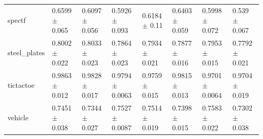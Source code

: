 \begin{tabular}{llllllll}
spectf & 0.6599 $\pm$ 0.065 & 0.6097 $\pm$ 0.056 & 0.5926 $\pm$ 0.093 & 0.6184 $\pm$ 0.11 & 0.6403 $\pm$ 0.059 & 0.5998 $\pm$ 0.072 & 0.539 $\pm$ 0.067 \\
steel\_plates & 0.8002 $\pm$ 0.022 & 0.8033 $\pm$ 0.023 & 0.7864 $\pm$ 0.023 & 0.7934 $\pm$ 0.021 & 0.7877 $\pm$ 0.016 & 0.7953 $\pm$ 0.015 & 0.7792 $\pm$ 0.021 \\
tictactoe & 0.9863 $\pm$ 0.012 & 0.9828 $\pm$ 0.017 & 0.9794 $\pm$ 0.0063 & 0.9759 $\pm$ 0.015 & 0.9815 $\pm$ 0.013 & 0.9701 $\pm$ 0.0064 & 0.9704 $\pm$ 0.019 \\
vehicle & 0.7451 $\pm$ 0.038 & 0.7344 $\pm$ 0.027 & 0.7527 $\pm$ 0.0087 & 0.7514 $\pm$ 0.019 & 0.7398 $\pm$ 0.015 & 0.7583 $\pm$ 0.022 & 0.7302 $\pm$ 0.038 \\
\bottomrule
\end{tabular}
